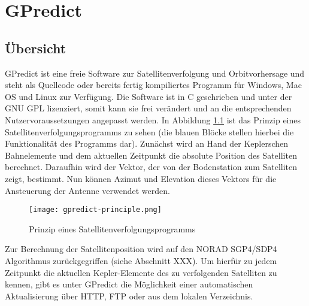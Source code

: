 
\chapter{GPredict}

\section{Übersicht}

GPredict ist eine freie Software zur Satellitenverfolgung und Orbitvorhersage und steht als Quellcode oder bereits fertig kompiliertes Programm für Windows, Mac OS und Linux zur Verfügung. Die Software ist in C geschrieben und unter der GNU \ac{GPL} lizenziert, somit kann sie frei verändert und an die entsprechenden Nutzervoraussetzungen angepasst werden.\newpar
In Abbildung \ref{fig:gpredict-principle} ist das Prinzip eines Satellitenverfolgungsprogramms zu sehen (die blauen Blöcke stellen hierbei die Funktionalität des Programms dar). Zunächst wird an Hand der Keplerschen Bahnelemente und dem aktuellen Zeitpunkt die absolute Position des Satelliten berechnet. Daraufhin wird der Vektor, der von der Bodenstation zum Satelliten zeigt, bestimmt. Nun können Azimut und Elevation dieses Vektors für die Ansteuerung der Antenne verwendet werden.

\begin{figure}[h]
	\centering
	\texttt{[image: gpredict-principle.png]}
	\caption{Prinzip eines Satellitenverfolgungsprogramms \cite{gpredictmanual}}
	\label{fig:gpredict-principle} 
\end{figure}

Zur Berechnung der Satellitenposition wird auf den NORAD SGP4/SDP4 Algorithmus zurückgegriffen (siehe Abschnitt XXX). Um hierfür zu jedem Zeitpunkt die aktuellen Kepler-Elemente des zu verfolgenden Satelliten zu kennen, gibt es unter GPredict die Möglichkeit einer automatischen Aktualisierung über HTTP, FTP oder aus dem lokalen Verzeichnis.


